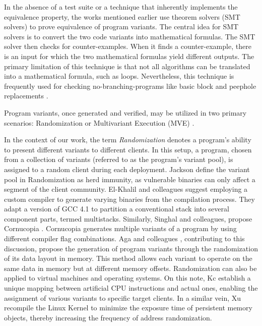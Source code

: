 \begin{checking}
    \label{check_by_smt}
    In the absence of a test suite or a technique that inherently implements the equivalence property, the works mentioned earlier use theorem solvers (SMT solvers) \cite{SMT_solver} to prove equivalence of program variants. 
    The central idea for SMT solvers is to convert the two code variants into mathematical formulas. 
    The SMT solver then checks for counter-examples. 
    When it finds a counter-example, there is an input for which the two mathematical formulas yield different outputs. 
    The primary limitation of this technique is that not all algorithms can be translated into a mathematical formula, such as loops. 
    Nevertheless, this technique is frequently used for checking no-branching-programs like basic block and peephole replacements \cite{SuperoptimizationScaling}.
\end{checking}


\begin{checking}
    \label{ai_drove}
    
\end{checking}



Program variants, once generated and verified, may be utilized in two primary scenarios: Randomization or Multivariant Execution (MVE) \cite{jackson}. 


\begin{strategy}[Randomization]
    \label{randomization}
    In the context of our work, the term \emph{Randomization} denotes a program's ability to present different variants to different clients. 
    In this setup, a program, chosen from a collection of variants (referred to as the program's variant pool), is assigned to a random client during each deployment. 
    Jackson \etal \cite{jackson} define the variant pool in Randomization as herd immunity, as vulnerable binaries can only affect a segment of the client community. 
    El-Khalil and colleagues \cite{ElKhalil2004} suggest employing a custom compiler to generate varying binaries from the compilation process. 
    They adapt a version of GCC 4.1 to partition a conventional stack into several component parts, termed multistacks. 
    Similarly, Singhal and colleagues, propose Cornucopia \cite{cornucopia}.
    Cornucopia generates multiple variants of a program by using different compiler flag combinations.
    Aga and colleagues \cite{aga2019smokestack}, contributing to this discussion, propose the generation of program variants through the randomization of its data layout in memory. 
    This method allows each variant to operate on the same data in memory but at different memory offsets. 
    Randomization can also be applied to virtual machines and operating systems. On this note, Kc \etal \cite{Kc03} establish a unique mapping between artificial CPU instructions and actual ones, enabling the assignment of various variants to specific target clients. 
    In a similar vein, Xu \etal \cite{xu2020merr} recompile the Linux Kernel to minimize the exposure time of persistent memory objects, thereby increasing the frequency of address randomization.
\end{strategy}


